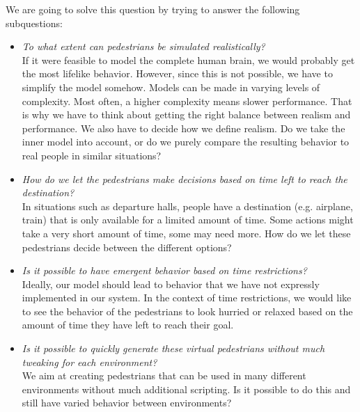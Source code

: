 \documentclass[11pt, a4paper]{book}
\begin{document}
We are going to solve this question by trying to answer the following subquestions:
\begin{itemize}
\item \emph{To what extent can pedestrians be simulated realistically?}\\
If it were feasible to model the complete human brain, we would probably get the most lifelike behavior. However, since this is not possible, we have to simplify the model somehow. Models can be made in varying levels of complexity. Most often, a higher complexity means slower performance. That is why we have to think about getting the right balance between realism and performance. We also have to decide how we define realism. Do we take the inner model into account, or do we purely compare the resulting behavior to real people in similar situations?

\item \emph{How do we let the pedestrians make decisions based on time left to reach the destination?}\\
In situations such as departure halls, people have a destination (e.g. airplane, train) that is only available for a limited amount of time. Some actions might take a very short amount of time, some may need more. How do we let these pedestrians decide between the different options?

\item \emph{Is it possible to have emergent behavior based on time restrictions?}\\
Ideally, our model should lead to behavior that we have not expressly implemented in our system. In the context of time restrictions, we would like to see the behavior of the pedestrians to look hurried or relaxed based on the amount of time they have left to reach their goal.


\item \emph{Is it possible to quickly generate these virtual pedestrians without much tweaking for each environment?}
\\We aim at creating pedestrians that can be used in many different environments without much additional scripting. Is it possible to do this and still have varied behavior between environments?

\end{itemize}
\end{document}
